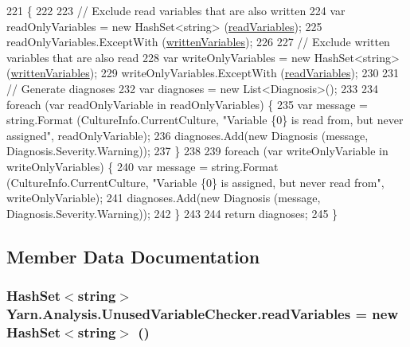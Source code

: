 \begin{DoxyCode}
221         \{
222 
223             \textcolor{comment}{// Exclude read variables that are also written}
224             var readOnlyVariables = \textcolor{keyword}{new} HashSet<string> (\hyperlink{a00165_a6b542092ddce1b92c9455d60899518a9}{readVariables});
225             readOnlyVariables.ExceptWith (\hyperlink{a00165_a0c2fe6eded1b10b135ca2469f5980a39}{writtenVariables});
226 
227             \textcolor{comment}{// Exclude written variables that are also read}
228             var writeOnlyVariables = \textcolor{keyword}{new} HashSet<string> (\hyperlink{a00165_a0c2fe6eded1b10b135ca2469f5980a39}{writtenVariables});
229             writeOnlyVariables.ExceptWith (\hyperlink{a00165_a6b542092ddce1b92c9455d60899518a9}{readVariables});
230 
231             \textcolor{comment}{// Generate diagnoses}
232             var diagnoses = \textcolor{keyword}{new} List<Diagnosis>();
233 
234             \textcolor{keywordflow}{foreach} (var readOnlyVariable \textcolor{keywordflow}{in} readOnlyVariables) \{
235                 var message = string.Format (CultureInfo.CurrentCulture, \textcolor{stringliteral}{"Variable \{0\} is read from, but
       never assigned"}, readOnlyVariable);
236                 diagnoses.Add(\textcolor{keyword}{new} Diagnosis (message, Diagnosis.Severity.Warning));
237             \}
238 
239             \textcolor{keywordflow}{foreach} (var writeOnlyVariable \textcolor{keywordflow}{in} writeOnlyVariables) \{
240                 var message = string.Format (CultureInfo.CurrentCulture, \textcolor{stringliteral}{"Variable \{0\} is assigned, but
       never read from"}, writeOnlyVariable);
241                 diagnoses.Add(\textcolor{keyword}{new} Diagnosis (message, Diagnosis.Severity.Warning));
242             \}
243 
244             \textcolor{keywordflow}{return} diagnoses;
245         \}
\end{DoxyCode}


\subsection{Member Data Documentation}
\hypertarget{a00165_a6b542092ddce1b92c9455d60899518a9}{
\subsubsection[{read\-Variables}]{\setlength{\rightskip}{0pt plus 5cm}Hash\-Set$<$string$>$ Yarn.\-Analysis.\-Unused\-Variable\-Checker.\-read\-Variables = new Hash\-Set$<$string$>$ ()\hspace{0.3cm}{\ttfamily [private]}}}\label{a00165_a6b542092ddce1b92c9455d60899518a9}


